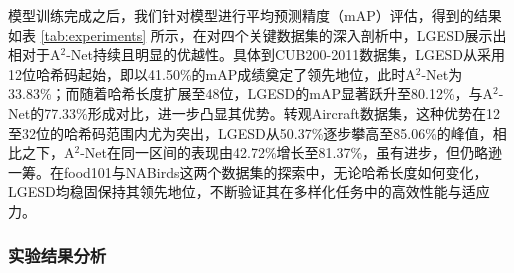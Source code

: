 模型训练完成之后，我们针对模型进行平均预测精度（mAP）评估，得到的结果如表 \ref{tab:experiments} 所示，在对四个关键数据集的深入剖析中，LGESD展示出相对于A${}^2$-Net持续且明显的优越性。具体到CUB200-2011数据集，LGESD从采用12位哈希码起始，即以41.50\%的mAP成绩奠定了领先地位，此时A${}^2$-Net为33.83\%；而随着哈希长度扩展至48位，LGESD的mAP显著跃升至80.12\%，与A${}^2$-Net的77.33\%形成对比，进一步凸显其优势。转观Aircraft数据集，这种优势在12至32位的哈希码范围内尤为突出，LGESD从50.37\%逐步攀高至85.06\%的峰值，相比之下，A${}^2$-Net在同一区间的表现由42.72\%增长至81.37\%，虽有进步，但仍略逊一筹。在food101与NABirds这两个数据集的探索中，无论哈希长度如何变化，LGESD均稳固保持其领先地位，不断验证其在多样化任务中的高效性能与适应力。





\subsubsection{实验结果分析}

